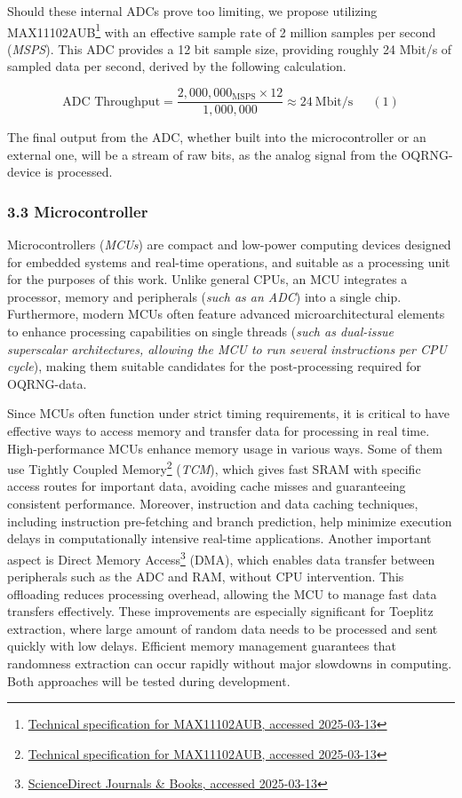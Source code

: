 \documentclass{sigchi}
\begin{document}
Should these internal ADCs prove too limiting, we propose utilizing MAX11102AUB\footnote{\href{https://www.farnell.com/datasheets/1913106.pdf}{Technical specification for MAX11102AUB, accessed 2025-03-13}} with an effective sample rate of 2 million samples per second (\emph{MSPS}). This ADC provides a 12 bit sample size, providing roughly 24 Mbit/s of sampled data per second, derived by the following calculation.

\[
\text{ADC Throughput}
= \frac{2,000,000_{\mathrm{MSPS}}\times12}{1,000,000}
\approx24\ \mathrm{Mbit/s}\phantom{123}(1)
\]

The final output from the ADC, whether built into the microcontroller or an external one, will be a stream of raw bits, as the analog signal from the OQRNG-device is processed.

\subsubsection{3.3 Microcontroller}\label{microcontroller}

Microcontrollers (\emph{MCUs}) are compact and low-power computing devices designed for embedded systems and real-time operations, and suitable as a processing unit for the purposes of this work. Unlike general CPUs, an MCU integrates a processor, memory and peripherals (\emph{such as an ADC}) into a single chip. Furthermore, modern MCUs often feature advanced microarchitectural elements to enhance processing capabilities on single threads (\emph{such as dual-issue superscalar architectures, allowing the MCU to run several instructions per CPU cycle}), making them suitable candidates for the post-processing required for OQRNG-data.

Since MCUs often function under strict timing requirements, it is critical to have effective ways to access memory and transfer data for processing in real time. High-performance MCUs enhance memory usage in various ways. Some of them use Tightly Coupled Memory\footnote{\href{https://www.farnell.com/datasheets/1913106.pdf}{Technical specification for MAX11102AUB, accessed 2025-03-13}} (\emph{TCM}), which gives fast SRAM with specific access routes for important data, avoiding cache misses and guaranteeing consistent performance. Moreover, instruction and data caching techniques, including instruction pre-fetching and branch prediction, help minimize execution delays in computationally intensive real-time applications. Another important aspect is Direct Memory Access\footnote{\href{https://www.sciencedirect.com/topics/computer-science/direct-memory-access}{ScienceDirect Journals \& Books, accessed 2025-03-13}} (DMA), which enables data transfer between peripherals such as the ADC and RAM, without CPU intervention. This offloading reduces processing overhead, allowing the MCU to manage fast data transfers effectively. These improvements are especially significant for Toeplitz extraction, where large amount of random data needs to be processed and sent quickly with low delays. Efficient memory management guarantees that randomness extraction can occur rapidly without major slowdowns in computing. Both approaches will be tested during development.
\end{document}
